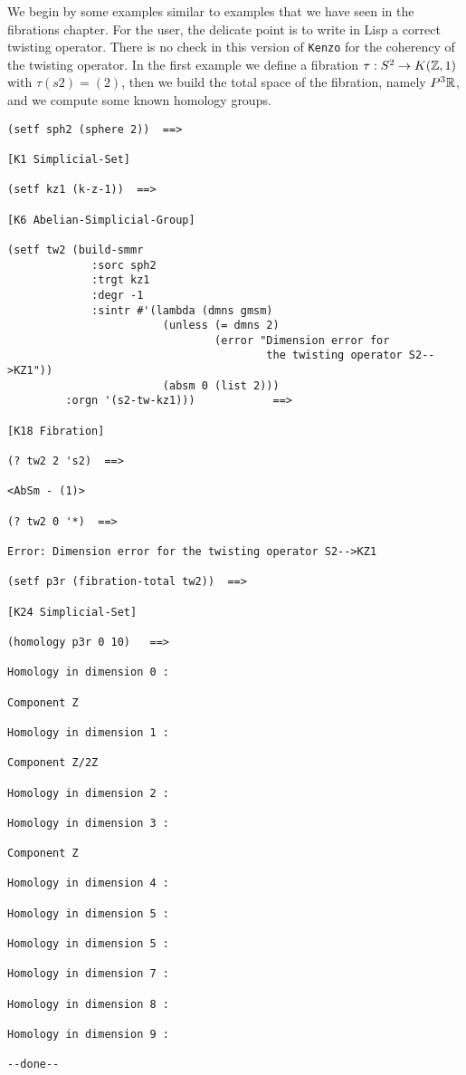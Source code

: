 We begin by some examples similar to examples that we have seen in the fibrations chapter.
For the user, the delicate point is to write in Lisp a correct twisting operator. There is no check
in this version of {\tt Kenzo} for the coherency of the twisting operator. In the first example
we define a fibration $\tau: S^2 \rightarrow K({\mathbb{Z}},1)$ with $\tau(s2)= (2)$, then we build the
total space of the fibration, namely $P^3{{\mathbb{R}}}$, and we compute some known homology groups.
{\footnotesize\begin{verbatim}
(setf sph2 (sphere 2))  ==>

[K1 Simplicial-Set]

(setf kz1 (k-z-1))  ==>

[K6 Abelian-Simplicial-Group]

(setf tw2 (build-smmr
             :sorc sph2
             :trgt kz1
             :degr -1
             :sintr #'(lambda (dmns gmsm)
                        (unless (= dmns 2)
                                (error "Dimension error for
                                        the twisting operator S2-->KZ1"))
                        (absm 0 (list 2)))
	     :orgn '(s2-tw-kz1)))            ==>

[K18 Fibration]

(? tw2 2 's2)  ==>

<AbSm - (1)>

(? tw2 0 '*)  ==>

Error: Dimension error for the twisting operator S2-->KZ1

(setf p3r (fibration-total tw2))  ==>

[K24 Simplicial-Set]

(homology p3r 0 10)   ==>

Homology in dimension 0 :

Component Z

Homology in dimension 1 :

Component Z/2Z

Homology in dimension 2 :

Homology in dimension 3 :

Component Z

Homology in dimension 4 :

Homology in dimension 5 :

Homology in dimension 5 :

Homology in dimension 7 :

Homology in dimension 8 :

Homology in dimension 9 :

--done--
\end{verbatim}}
